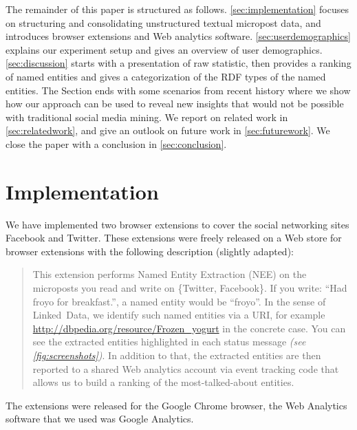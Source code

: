 \documentclass{iosart2c}
\begin{document}
The remainder of this paper is structured as follows.
\autoref{sec:implementation} focuses on structuring and consolidating unstructured textual micropost data, and introduces browser extensions and Web analytics software.
\autoref{sec:userdemographics} explains our experiment setup and gives an overview of user demographics.
\autoref{sec:discussion} starts with a presentation of raw statistic, then provides a ranking of named entities and gives a categorization of the RDF types of the named entities.
The Section ends with some scenarios from recent history where we show how our approach can be used to reveal new insights that would not be possible with traditional social media mining.
We report on related work in \autoref{sec:relatedwork}, and give an outlook on future work in \autoref{sec:futurework}.
We close the paper with a conclusion in \autoref{sec:conclusion}.

\section{Implementation} \label{sec:implementation}
We have implemented two browser extensions to cover the social networking sites Facebook and Twitter.
These extensions were freely released on a Web store for browser extensions with the following description (slightly adapted):
\begin{quotation}
This extension performs Named Entity Extraction (NEE) on the microposts you read and write on \{Twitter, Facebook\}.
If you write: ``Had froyo for breakfast.'', a named entity would be ``froyo''.
In the sense of Linked~Data, we identify such named entities via a URI, for example \url{http://dbpedia.org/resource/Frozen_yogurt} in the concrete case.
You can see the extracted entities highlighted in each status message \emph{(see \autoref{fig:screenshots})}.
In addition to that, the extracted entities are then reported to a shared Web analytics account via event tracking code  that allows us to build a ranking of the most-talked-about entities.
\end{quotation}
The extensions were released for the Google Chrome browser, the Web Analytics software that we used was Google Analytics.
\end{document}
